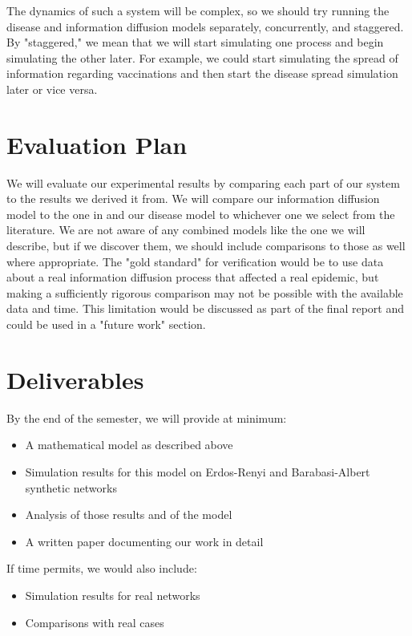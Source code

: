 \documentclass{article}
\begin{document}
The dynamics of such a system will be complex, so we should try running the disease and information diffusion models separately, concurrently, and staggered. By "staggered," we mean that we will start simulating one process and begin simulating the other later. For example, we could start simulating the spread of information regarding vaccinations and then start the disease spread simulation later or vice versa. 

\section{Evaluation Plan}
We will evaluate our experimental results by comparing each part of our system to the results we derived it from. We will compare our information diffusion model to the one in \cite{Tambuscio2015FactcheckingEO} and our disease model to whichever one we select from the literature. We are not aware of any combined models like the one we will describe, but if we discover them, we should include comparisons to those as well where appropriate. The "gold standard" for verification would be to use data about a real information diffusion process that affected a real epidemic, but making a sufficiently rigorous comparison may not be possible with the available data and time. This limitation would be discussed as part of the final report and could be used in a "future work" section.

\section{Deliverables}
By the end of the semester, we will provide at minimum:
\begin{itemize}
    \item A mathematical model as described above
    \item Simulation results for this model on Erdos-Renyi and Barabasi-Albert synthetic networks
    \item Analysis of those results and of the model
    \item A written paper documenting our work in detail
\end{itemize}
If time permits, we would also include:
\begin{itemize}
    \item Simulation results for real networks
    \item Comparisons with real cases
\end{itemize}



\end{document}
